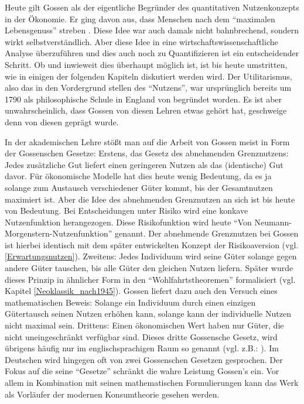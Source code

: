 Heute gilt Gossen als der eigentliche Begründer des quantitativen Nutzenkonzepts in der Ökonomie. Er ging davon aus, dass Menschen nach dem "`maximalen Lebensgenuss"' streben \parencite[S. 284]{Rosner2012}. Diese Idee war auch damals nicht bahnbrechend, sondern wirkt selbstverständlich. Aber diese Idee in eine wirtschaftswissenschaftliche Analyse überzuführen und dies auch noch zu Quantifizieren ist ein entscheidender Schritt. Ob und inwieweit dies überhaupt möglich ist, ist bis heute umstritten, wie in einigen der folgenden Kapiteln diskutiert werden wird. Der Utilitarismus, also das in den Vordergrund stellen des "`Nutzens"', war ursprünglich bereits um 1790 als philosophische Schule in England von \textcite{Bentham1789} begründet worden. Es ist aber unwahrscheinlich, dass Gossen von diesen Lehren etwas gehört hat, geschweige denn von diesen geprägt wurde. 

In der akademischen Lehre stößt man auf die Arbeit von Gossen meist in Form der Gossenschen Gesetze: Erstens, das Gesetz des abnehmenden Grenznutzens: Jedes zusätzliche Gut liefert einen geringeren Nutzen als das (identische) Gut davor. Für ökonomische Modelle hat dies heute wenig Bedeutung, da es ja solange zum Austausch verschiedener Güter kommt, bis der Gesamtnutzen maximiert ist. Aber die Idee des abnehmenden Grenznutzen an sich ist bis heute von Bedeutung. Bei Entscheidungen unter Risiko wird eine konkave Nutzenfunktion herangezogen. Diese Risikofunktion wird heute "`Von Neumann-Morgenstern-Nutzenfunktion"' genannt. Der abnehmende Grenznutzen bei Gossen ist hierbei identisch mit dem später entwickelten Konzept der Risikoaversion (vgl. \ref{Erwartungsnutzen}).
Zweitens: Jedes Individuum wird seine Güter solange gegen andere Güter tauschen, bis alle Güter den gleichen Nutzen liefern. Später wurde dieses Prinzip in ähnlicher Form in den "`Wohlfahrtstheoremen"' formalisiert (vgl. Kapitel \ref{Neoklassik_nach1945}). Gossen liefert dazu auch den Versuch eines mathematischen Beweis: Solange ein Individuum durch einen einzigen Gütertausch seinen Nutzen erhöhen kann, solange kann der individuelle Nutzen nicht maximal sein.
Drittens: Einen ökonomischen Wert haben nur Güter, die nicht uneingeschränkt verfügbar sind. Dieses dritte Gossensche Gesetz, wird übrigens häufig nur im englischsprachigen Raum so genannt (vgl. z.B.: \parencite{Blaug1973}). Im Deutschen wird hingegen oft von zwei Gossenschen Gesetzen gesprochen.
Der Fokus auf die seine "`Gesetze"' schränkt die wahre Leistung Gossen's ein. Vor allem in Kombination mit seinen mathematischen Formulierungen kann das Werk als Vorläufer der modernen Konsumtheorie gesehen werden.

